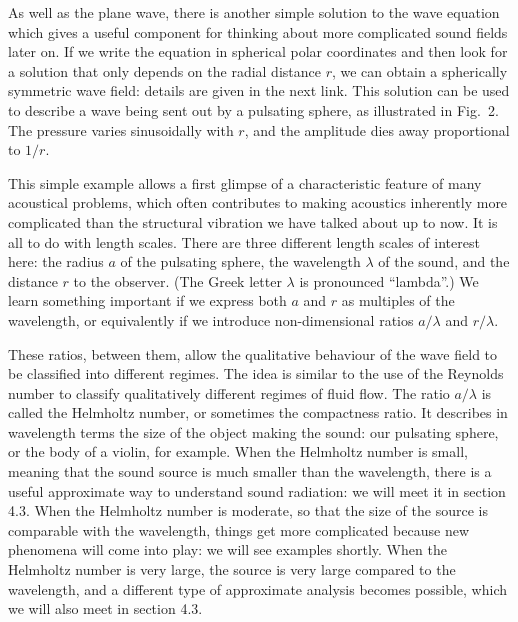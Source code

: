   As well as the plane wave, there is another simple solution to the wave 
  equation which gives a useful component for thinking about more complicated 
  sound fields later on. If we write the equation in spherical polar 
  coordinates and then look for a solution that only depends on the radial 
  distance $r$, we can obtain a spherically symmetric wave field: details are 
  given in the next link. This solution can be used to describe a wave being 
  sent out by a pulsating sphere, as illustrated in Fig.\ 2. The pressure 
  varies sinusoidally with $r$, and the amplitude dies away proportional to 
  $1/r$. 

  This simple example allows a first glimpse of a characteristic feature of 
  many acoustical problems, which often contributes to making acoustics 
  inherently more complicated than the structural vibration we have talked 
  about up to now. It is all to do with length scales. There are three 
  different length scales of interest here: the radius $a$ of the pulsating 
  sphere, the wavelength $\lambda$ of the sound, and the distance $r$ to the 
  observer. (The Greek letter $\lambda$ is pronounced ``lambda''.) We learn 
  something important if we express both $a$ and $r$ as multiples of the 
  wavelength, or equivalently if we introduce non-dimensional ratios 
  $a/\lambda$ and $r/\lambda$. 

  These ratios, between them, allow the qualitative behaviour of the wave field 
  to be classified into different regimes. The idea is similar to the use of 
  the Reynolds number to classify qualitatively different regimes of fluid 
  flow. The ratio $a/\lambda$ is called the Helmholtz number, or sometimes the 
  compactness ratio. It describes in wavelength terms the size of the object 
  making the sound: our pulsating sphere, or the body of a violin, for example. 
  When the Helmholtz number is small, meaning that the sound source is much 
  smaller than the wavelength, there is a useful approximate way to understand 
  sound radiation: we will meet it in section 4.3. When the Helmholtz number is 
  moderate, so that the size of the source is comparable with the wavelength, 
  things get more complicated because new phenomena will come into play: we 
  will see examples shortly. When the Helmholtz number is very large, the 
  source is very large compared to the wavelength, and a different type of 
  approximate analysis becomes possible, which we will also meet in section 
  4.3. 

